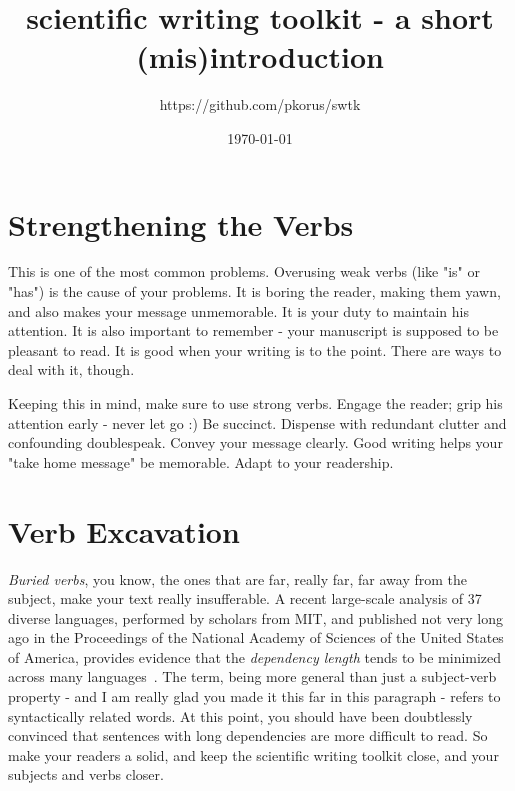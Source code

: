 \documentclass[twocolumn,11pt]{article}
\title{scientific writing toolkit - a short (mis)introduction}
\author{https://github.com/pkorus/swtk}
\date{\today}
\begin{document}
\maketitle

	
\section{Strengthening the Verbs}

This is one of the most common problems. Overusing weak verbs (like "is" or "has") is the cause of your problems. It is boring the reader, making them yawn, and also makes your message unmemorable. It is your duty to maintain his attention. It is also important to remember - your manuscript is supposed to be pleasant to read. It is good when your writing is to the point. There are ways to deal with it, though.

Keeping this in mind, make sure to use strong verbs. Engage the reader; grip his attention early - never let go :) Be succinct. Dispense with redundant clutter and confounding doublespeak. Convey your message clearly. Good writing helps your "take home message" be memorable. Adapt to your readership. 

\section{Verb Excavation}

\emph{Buried verbs}, you know, the ones that are far, really far, far away from the subject, make your text really insufferable. A recent large-scale analysis of 37 diverse languages, performed by scholars from MIT, and published not very long ago in the Proceedings of the National Academy of Sciences of the United States of America, provides evidence that the \emph{dependency length} tends to be minimized across many languages~\cite{dlm}. The term, being more general than just a subject-verb property - and I am really glad you made it this far in this paragraph - refers to syntactically related words. At this point, you should have been doubtlessly convinced that sentences with long dependencies are more difficult to read. So make your readers a solid, and keep the scientific writing toolkit close, and your subjects and verbs closer. 
\end{document}
